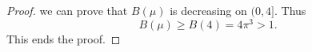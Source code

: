 \documentclass[11pt]{article}
\begin{document}
\begin{proof}
we can prove that $B(\mu)$ is decreasing  on $(0,4]$. Thus
\begin{equation*}
  B(\mu)\geq B(4)=4\pi^3>1.
\end{equation*}
This ends the proof.
\end{proof}
\end{document}
